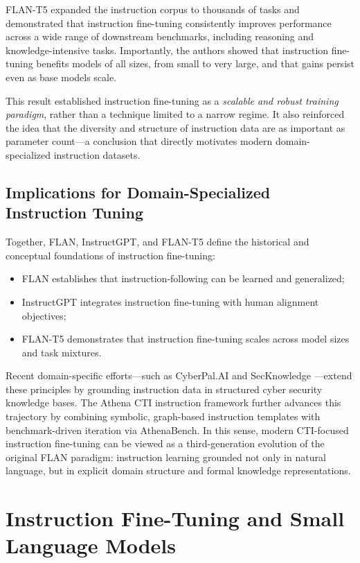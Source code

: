\documentclass[unnumsec,webpdf,contemporary,large]{oup-authoring-template}
\theoremstyle{thmstyleone}
\theoremstyle{thmstyletwo}
\theoremstyle{thmstylethree}
\begin{document}
FLAN-T5 expanded the instruction corpus to thousands of tasks and demonstrated that instruction fine-tuning consistently improves performance across a wide range of downstream benchmarks, including reasoning and knowledge-intensive tasks. Importantly, the authors showed that instruction fine-tuning benefits models of all sizes, from small to very large, and that gains persist even as base models scale.

This result established instruction fine-tuning as a \emph{scalable and robust training paradigm}, rather than a technique limited to a narrow regime. It also reinforced the idea that the diversity and structure of instruction data are as important as parameter count---a conclusion that directly motivates modern domain-specialized instruction datasets.

\subsection{Implications for Domain-Specialized Instruction Tuning}

Together, FLAN, InstructGPT, and FLAN-T5 define the historical and conceptual foundations of instruction fine-tuning:
\begin{itemize}
  \item FLAN establishes that instruction-following can be learned and generalized;
  \item InstructGPT integrates instruction fine-tuning with human alignment objectives;
  \item FLAN-T5 demonstrates that instruction fine-tuning scales across model sizes and task mixtures.
\end{itemize}

Recent domain-specific efforts---such as CyberPal.AI and SecKnowledge \cite{levi2024cyberpal,levi2025toward}---extend these principles by grounding instruction data in structured cyber security knowledge bases. The Athena CTI instruction framework further advances this trajectory by combining symbolic, graph-based instruction templates with benchmark-driven iteration via AthenaBench. In this sense, modern CTI-focused instruction fine-tuning can be viewed as a third-generation evolution of the original FLAN paradigm: instruction learning grounded not only in natural language, but in explicit domain structure and formal knowledge representations.


\section{Instruction Fine-Tuning and Small Language Models}
\label{sec:ift-slm}
\end{document}
